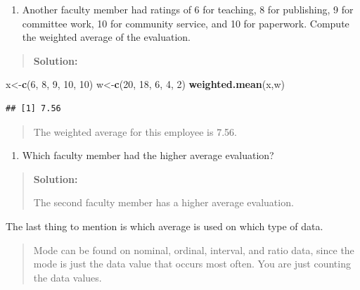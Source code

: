\documentclass[]{book}
\newenvironment{Shaded}{\begin{snugshade}}{\end{snugshade}}
\newcommand{\DecValTok}[1]{\textcolor[rgb]{0.00,0.00,0.81}{#1}}
\newcommand{\KeywordTok}[1]{\textcolor[rgb]{0.13,0.29,0.53}{\textbf{#1}}}
\newcommand{\NormalTok}[1]{#1}
\providecommand{\tightlist}{%
  \setlength{\itemsep}{0pt}\setlength{\parskip}{0pt}}
\begin{document}
\begin{enumerate}
\def\labelenumi{\alph{enumi})}
\setcounter{enumi}{1}
\tightlist
\item
  Another faculty member had ratings of 6 for teaching, 8 for publishing, 9 for committee work, 10 for community service, and 10 for paperwork. Compute the weighted average of the evaluation.
\end{enumerate}

\begin{quote}
\textbf{Solution:}
\end{quote}

\begin{Shaded}
\begin{Highlighting}[]
\NormalTok{x<-}\KeywordTok{c}\NormalTok{(}\DecValTok{6}\NormalTok{, }\DecValTok{8}\NormalTok{, }\DecValTok{9}\NormalTok{, }\DecValTok{10}\NormalTok{, }\DecValTok{10}\NormalTok{)}
\NormalTok{w<-}\KeywordTok{c}\NormalTok{(}\DecValTok{20}\NormalTok{, }\DecValTok{18}\NormalTok{, }\DecValTok{6}\NormalTok{, }\DecValTok{4}\NormalTok{, }\DecValTok{2}\NormalTok{)}
\KeywordTok{weighted.mean}\NormalTok{(x,w)}
\end{Highlighting}
\end{Shaded}

\begin{verbatim}
## [1] 7.56
\end{verbatim}

\begin{quote}
The weighted average for this employee is 7.56.
\end{quote}

\begin{enumerate}
\def\labelenumi{\alph{enumi})}
\setcounter{enumi}{2}
\tightlist
\item
  Which faculty member had the higher average evaluation?
\end{enumerate}

\begin{quote}
\textbf{Solution:}

The second faculty member has a higher average evaluation.
\end{quote}

The last thing to mention is which average is used on which type of
data.

\begin{quote}
Mode can be found on nominal, ordinal, interval, and ratio data, since the mode is just the data value that occurs most often. You are just counting the data values.
\end{quote}
\end{document}
